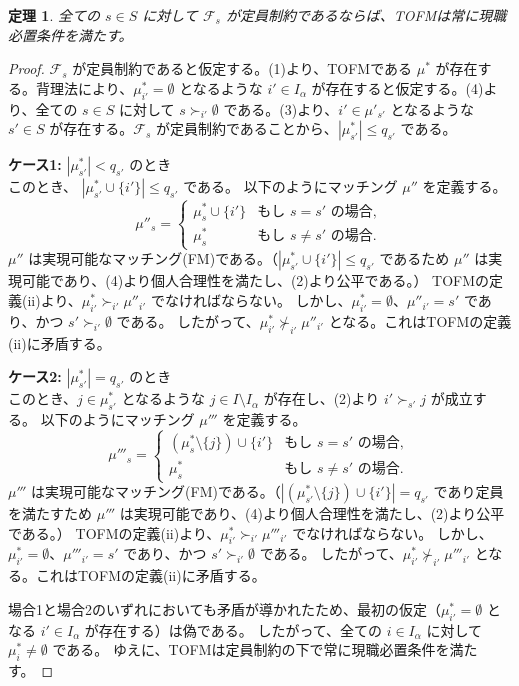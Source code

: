 \documentclass[12pt, a4paper]{article}
\theoremstyle{definition}
\theoremstyle{remark}
\theoremstyle{plain}
\newtheorem{theorem}{定理}
\begin{document}
\begin{theorem}
  全ての $s \in S$ に対して $\mathcal{F}_s$ が定員制約であるならば、TOFMは常に現職必置条件を満たす。
\end{theorem}

\begin{proof}
  $\mathcal{F}_s$ が定員制約であると仮定する。(1)より、TOFMである $\mu^*$ が存在する。背理法により、$\mu^*_{i'} = \emptyset$ となるような $i' \in I_\alpha$ が存在すると仮定する。(4)より、全ての $s \in S$ に対して $s \succ_{i'} \emptyset$ である。(3)より、$i' \in \mu'_{s'}$ となるような $s' \in S$ が存在する。$\mathcal{F}_s$ が定員制約であることから、$|\mu^*_{s'}| \leq q_{s'}$ である。

  \textbf{ケース1:} $|\mu^*_{s'}| < q_{s'}$ のとき\\
  このとき、 $|\mu^*_{s'} \cup \{i'\}| \leq q_{s'}$ である。
  以下のようにマッチング $\mu''$ を定義する。
  \[
      \mu''_{s} =
      \begin{cases}
      \mu^*_{s} \cup \{i'\} & \text{もし } s = s' \text{ の場合}, \\
      \mu^*_{s} & \text{もし } s \neq s' \text{ の場合}.
      \end{cases}
  \]
  $\mu''$ は実現可能なマッチング(FM)である。（$|\mu^*_{s'} \cup \{i'\}| \leq q_{s'}$ であるため $\mu''$ は実現可能であり、(4)より個人合理性を満たし、(2)より公平である。）
  TOFMの定義(ii)より、$\mu^*_{i'} \succ_{i'} \mu''_{i'}$ でなければならない。
  しかし、$\mu^*_{i'} = \emptyset$、$\mu''_{i'} = s'$ であり、かつ $s' \succ_{i'} \emptyset$ である。
  したがって、$\mu^*_{i'} \nsucc_{i'} \mu''_{i'}$ となる。これはTOFMの定義(ii)に矛盾する。

  \textbf{ケース2:} $|\mu^*_{s'}| = q_{s'}$ のとき\\
このとき、$j \in \mu^*_{s'}$ となるような $j \in I \setminus I_\alpha$ が存在し、(2)より $i' \succ_{s'} j$ が成立する。
以下のようにマッチング $\mu'''$ を定義する。
\[
    \mu'''_{s} =
    \begin{cases}
    (\mu^*_{s} \setminus \{j\}) \cup \{i'\} & \text{もし } s = s' \text{ の場合}, \\
    \mu^*_{s} & \text{もし } s \neq s' \text{ の場合}.
    \end{cases}
\]
$\mu'''$ は実現可能なマッチング(FM)である。（$|(\mu^*_{s'}\setminus \{j\}) \cup \{i'\}| = q_{s'}$ であり定員を満たすため $\mu'''$ は実現可能であり、(4)より個人合理性を満たし、(2)より公平である。）
TOFMの定義(ii)より、$\mu^*_{i'} \succ_{i'} \mu'''_{i'}$ でなければならない。
しかし、$\mu^*_{i'} = \emptyset$、$\mu'''_{i'} = s'$ であり、かつ $s' \succ_{i'} \emptyset$ である。
したがって、$\mu^*_{i'} \nsucc_{i'} \mu'''_{i'}$ となる。これはTOFMの定義(ii)に矛盾する。

場合1と場合2のいずれにおいても矛盾が導かれたため、最初の仮定（$\mu^*_{i'} = \emptyset$ となる $i' \in I_\alpha$ が存在する）は偽である。
したがって、全ての $i \in I_\alpha$ に対して $\mu^*_i \neq \emptyset$ である。
ゆえに、TOFMは定員制約の下で常に現職必置条件を満たす。
\end{proof}
\end{document}
